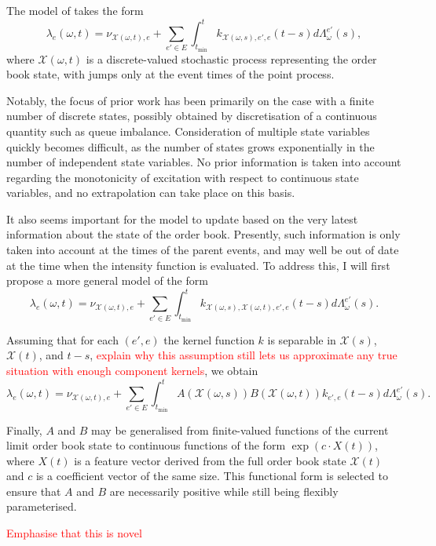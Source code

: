 \documentclass[honours,12pt]{unswthesis}
\numberwithin{equation}{section}
\begin{document}
The model of \cite{MoriaruPatrichiPakkanen} takes the form
$$\lambda_e(\omega,t) = \nu_{\mathcal{X}(\omega,t),e} + \sum_{e'\in E}\int_{t_\mathrm{min}}^t k_{\mathcal{X}(\omega,s),e',e}(t-s)d\Lambda_\omega^{e'}(s),$$
where $\mathcal{X}(\omega,t)$ is a discrete-valued stochastic process representing the order book state, with jumps only at the event times of the point process.

Notably, the focus of prior work has been primarily on the case with a finite number of discrete states, possibly obtained by discretisation of a continuous quantity such as queue imbalance. Consideration of multiple state variables quickly becomes difficult, as the number of states grows exponentially in the number of independent state variables. No prior information is taken into account regarding the monotonicity of excitation with respect to continuous state variables, and no extrapolation can take place on this basis.

It also seems important for the model to update based on the very latest information about the state of the order book. Presently, such information is only taken into account at the times of the parent events, and may well be out of date at the time when the intensity function is evaluated. To address this, I will first propose a more general model of the form
$$\lambda_e(\omega,t) = \nu_{\mathcal{X}(\omega,t),e} + \sum_{e'\in E}\int_{t_\mathrm{min}}^t k_{\mathcal{X}(\omega,s),\mathcal{X}(\omega,t),e',e}(t-s)d\Lambda_\omega^{e'}(s).$$

Assuming that for each $(e',e)$ the kernel function $k$ is separable in $\mathcal{X}(s)$, $\mathcal{X}(t)$, and $t-s$, \textcolor{red}{explain why this assumption still lets us approximate any true situation with enough component kernels}, we obtain
$$\lambda_e(\omega,t) = \nu_{\mathcal{X}(\omega,t),e} + \sum_{e'\in E}\int_{t_\mathrm{min}}^t A(\mathcal{X}(\omega,s))B(\mathcal{X}(\omega,t))k_{e',e}(t-s)d\Lambda_\omega^{e'}(s).$$

Finally, $A$ and $B$ may be generalised from finite-valued functions of the current limit order book state to continuous functions of the form $\exp(c\cdot X(t))$, where $X(t)$ is a feature vector derived from the full order book state $\mathcal{X}(t)$ and $c$ is a coefficient vector of the same size. This functional form is selected to ensure that $A$ and $B$ are necessarily positive while still being flexibly parameterised.

\textcolor{red}{Emphasise that this is novel}
\end{document}
